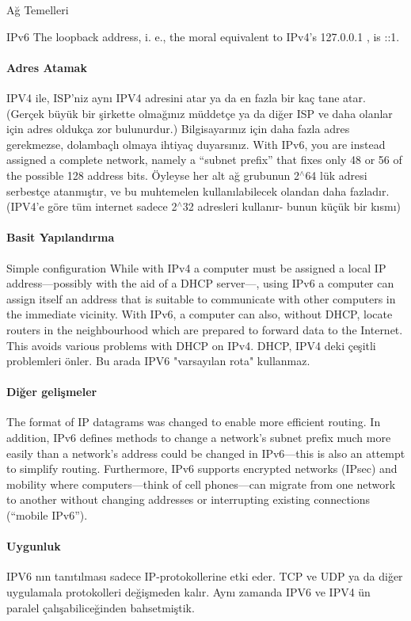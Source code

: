 \begin{section}{Ağ Temelleri}
\begin{subsection}{IPv6}
The loopback address, i. e., the moral equivalent to IPv4’s 127.0.0.1 , is ::1.

\paragraph{Adres Atamak}{IPV4 ile, ISP'niz aynı IPV4 adresini atar ya da en fazla bir kaç tane atar. (Gerçek büyük bir şirkette olmağınız müddetçe ya da diğer ISP ve daha olanlar için adres oldukça zor bulunurdur.) Bilgisayarınız için daha fazla adres gerekmezse, dolambaçlı olmaya ihtiyaç duyarsınız. With IPv6, you are instead assigned a complete network, namely a “subnet prefix” that fixes only 48 or 56 of the possible 128 address bits. Öyleyse her alt ağ grubunun 2$ ^\wedge $64 lük adresi serbestçe atanmıştır, ve bu muhtemelen kullanılabilecek olandan daha fazladır. (IPV4'e göre tüm internet sadece 2$ ^\wedge $32 adresleri kullanır- bunun küçük bir kısmı)}

\paragraph{Basit Yapılandırma}{Simple configuration While with IPv4 a computer must be assigned a local IP address—possibly with the aid of a DHCP server—, using IPv6 a computer can assign itself an address that is suitable to communicate with other computers in the immediate vicinity. With IPv6, a computer can also, without DHCP, locate routers in the neighbourhood which are prepared to forward data to the Internet. This avoids various problems with DHCP on IPv4.} DHCP, IPV4 deki çeşitli problemleri önler. Bu arada IPV6 "varsayılan rota" kullanmaz.

\paragraph{Diğer gelişmeler}{The format of IP datagrams was changed to enable more efficient routing. In addition, IPv6 defines methods to change a network’s subnet prefix much more easily than a network’s address could be changed in IPv6—this is also an attempt to simplify routing. Furthermore, IPv6 supports encrypted networks (IPsec) and mobility where computers—think of cell phones—can migrate from one network to another without changing addresses or interrupting existing connections (“mobile IPv6”).}

\paragraph{Uygunluk}{IPV6 nın tanıtılması sadece IP-protokollerine etki eder. TCP ve UDP ya da diğer uygulamala protokolleri değişmeden kalır. Aynı zamanda IPV6 ve IPV4 ün paralel çalışabiliceğinden bahsetmiştik.}


\end{subsection}
\end{section}

